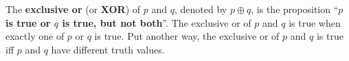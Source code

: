 \vspace*{-.1in} %

%
%
%
%
%
%
%
%

\begin{df}
The {\bf exclusive or} (or {\bf XOR}) of $p$ and $q$,
denoted by \boldmath$p\oplus q$, is the proposition ``{\bf \boldmath$p$ is true or \boldmath$q$ is true, but not both}''.
The exclusive or of $p$ and $q$ is true when exactly one of $p$ or $q$ is true.
Put another way, the exclusive or of $p$ and $q$ is true iff $p$ and $q$ have different truth values.
\end{df}

